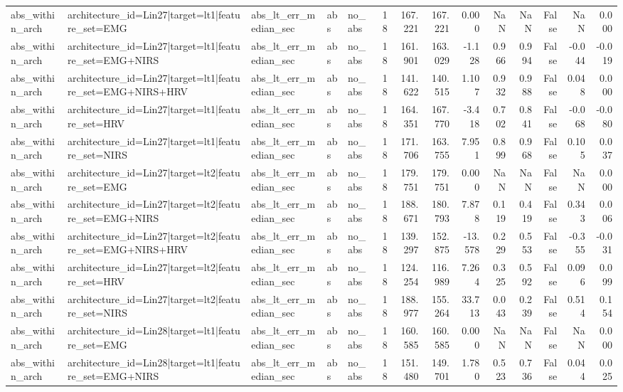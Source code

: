 \begin{table}
\begin{tabular}{lllllrrrrrrrrr}
abs_within_arch & architecture_id=Lin27|target=lt1|feature_set=EMG & abs_lt_err_median_sec & abs & no_abs & 18 & 167.221 & 167.221 & 0.000 & NaN & NaN & False & NaN & 0.000 \\
abs_within_arch & architecture_id=Lin27|target=lt1|feature_set=EMG+NIRS & abs_lt_err_median_sec & abs & no_abs & 18 & 161.901 & 163.029 & -1.128 & 0.966 & 0.994 & False & -0.044 & -0.019 \\
abs_within_arch & architecture_id=Lin27|target=lt1|feature_set=EMG+NIRS+HRV & abs_lt_err_median_sec & abs & no_abs & 18 & 141.622 & 140.515 & 1.107 & 0.932 & 0.988 & False & 0.048 & 0.000 \\
abs_within_arch & architecture_id=Lin27|target=lt1|feature_set=HRV & abs_lt_err_median_sec & abs & no_abs & 18 & 164.351 & 167.770 & -3.418 & 0.702 & 0.841 & False & -0.068 & -0.080 \\
abs_within_arch & architecture_id=Lin27|target=lt1|feature_set=NIRS & abs_lt_err_median_sec & abs & no_abs & 18 & 171.706 & 163.755 & 7.951 & 0.899 & 0.968 & False & 0.105 & 0.037 \\
abs_within_arch & architecture_id=Lin27|target=lt2|feature_set=EMG & abs_lt_err_median_sec & abs & no_abs & 18 & 179.751 & 179.751 & 0.000 & NaN & NaN & False & NaN & 0.000 \\
abs_within_arch & architecture_id=Lin27|target=lt2|feature_set=EMG+NIRS & abs_lt_err_median_sec & abs & no_abs & 18 & 188.671 & 180.793 & 7.878 & 0.119 & 0.419 & False & 0.343 & 0.006 \\
abs_within_arch & architecture_id=Lin27|target=lt2|feature_set=EMG+NIRS+HRV & abs_lt_err_median_sec & abs & no_abs & 18 & 139.297 & 152.875 & -13.578 & 0.229 & 0.553 & False & -0.355 & -0.031 \\
abs_within_arch & architecture_id=Lin27|target=lt2|feature_set=HRV & abs_lt_err_median_sec & abs & no_abs & 18 & 124.254 & 116.989 & 7.264 & 0.325 & 0.592 & False & 0.096 & 0.099 \\
abs_within_arch & architecture_id=Lin27|target=lt2|feature_set=NIRS & abs_lt_err_median_sec & abs & no_abs & 18 & 188.977 & 155.264 & 33.713 & 0.043 & 0.239 & False & 0.514 & 0.154 \\
abs_within_arch & architecture_id=Lin28|target=lt1|feature_set=EMG & abs_lt_err_median_sec & abs & no_abs & 18 & 160.585 & 160.585 & 0.000 & NaN & NaN & False & NaN & 0.000 \\
abs_within_arch & architecture_id=Lin28|target=lt1|feature_set=EMG+NIRS & abs_lt_err_median_sec & abs & no_abs & 18 & 151.480 & 149.701 & 1.780 & 0.523 & 0.736 & False & 0.044 & 0.025 \\

\end{tabular}
\end{table}
